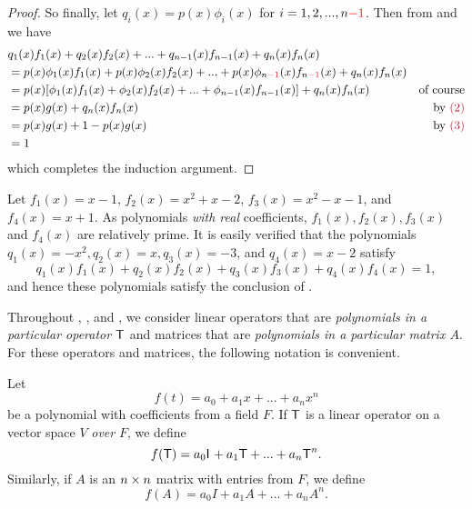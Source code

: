 \begin{proof}
So finally, let \(q_i(x) = p(x)\phi_i(x)\) for \(i= 1, 2, ..., n \RED{- 1}\).
Then from  and  we have
\begin{align*}
    & q_1(x)f_1(x) + q_2(x)f_2(x) + ... + q_{n-1}(x)f_{n-1}(x) + q_n(x)f_n(x) \\
    & = p(x)\phi_1(x)f_1(x) + p(x)\phi_2(x)f_2(x) + ... + p(x)\phi_{n\RED{-1}}(x)f_{n\RED{-1}}(x) + q_n(x)f_n(x) \\
    & = p(x) [\phi_1(x)f_1(x) + \phi_2(x)f_2(x) + ... + \phi_{n-1}(x)f_{n-1}(x)] + q_n(x)f_n(x) & \text{of course} \\
    & = p(x) g(x) + q_n(x)f_n(x) & \text{by \MAROON{(2)}} \\
    & = p(x) g(x) + 1 - p(x)g(x) & \text{by \MAROON{(3)}} \\
    & = 1
\end{align*}
which completes the induction argument.
\end{proof}

\begin{example} \label{example e.1}
Let \(f_1(x) = x - 1\), \(f_2(x) = x^2 + x - 2\), \(f_3(x) = x^2 - x - 1\), and \(f_4(x) = x + 1\).
As polynomials \emph{with real} coefficients, \(f_1(x), f_2(x), f_3(x)\) and \(f_4(x)\) are relatively prime.
It is easily verified that the polynomials \(q_1(x) = -x^2, q_2(x) = x, q_3(x) = -3\), and \(q_4(x) = x - 2\) satisfy
\[
    q_1(x)f_1(x) + q_2(x)f_2(x) + q_3(x)f_3(x) + q_4(x)f_4(x) = 1,
\]
and hence these polynomials satisfy the conclusion of .
\end{example}

Throughout , , and , we consider linear operators that are \emph{polynomials in a particular operator \(\textsf{T}\)} and matrices that are \emph{polynomials in a particular matrix \(A\)}.
For these operators and matrices, the following notation is convenient.

\begin{appendix definition} \label{def e.3}
Let
\[
    f(t) = a_0 + a_1 x + ... + a_n x^n
\]
be a polynomial with coefficients from a field \(F\).
If \(\textsf{T}\) is a linear operator on a vector space \(V\) \emph{over} \(F\), we define
\[
    f(\textsf{T}) = a_0 \textsf{I}_{_{}} + a_1 \textsf{T} + ... + a_n \textsf{T}^n.
\]
Similarly, if \(A\) is an \(n \times n\) matrix with entries from \(F\), we define
\[
    f(A) = a_0 I + a_1 A + ... + a_n A^n.
\]
\end{appendix definition}

